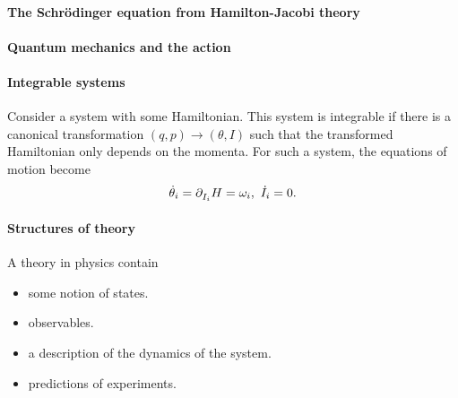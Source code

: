 \paragraph{The Schrödinger equation from Hamilton-Jacobi theory}

\paragraph{Quantum mechanics and the action}

\paragraph{Integrable systems}
Consider a system with some Hamiltonian. This system is integrable if there is a canonical transformation $(q, p)\to (\theta, I)$ such that the transformed Hamiltonian only depends on the momenta. For such a system, the equations of motion become
\begin{align*}
	\dot{\theta}_{i} = \partial^{}_{I_{i}}H = \omega_{i},\ \dot{I}_{i} = 0.
\end{align*}

\paragraph{Structures of theory}
A theory in physics contain
\begin{itemize}
	\item some notion of states.
	\item observables.
	\item a description of the dynamics of the system.
	\item predictions of experiments.
\end{itemize}

